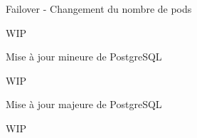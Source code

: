 
\begin{frame}[fragile]{Failover - Changement du nombre de pods}

   WIP

\end{frame}


\begin{frame}[fragile]{Mise à jour mineure de PostgreSQL}

   WIP

\end{frame}


\begin{frame}[fragile]{Mise à jour majeure de PostgreSQL}

   WIP

\end{frame}


